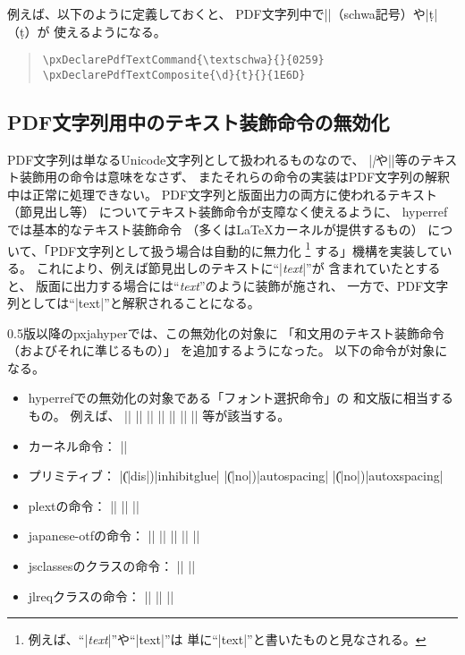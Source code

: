 \documentclass[uplatex,dvipdfmx,a4paper]{jsarticle}
\newcommand{\Pkg}[1]{\textsf{#1}}
\newcommand{\Means}{：\quad}
\newcommand{\／}{\mbox{}／\mbox{}}
\begin{document}
例えば、以下のように定義しておくと、
PDF文字列中で|\textschwa|（schwa記号）や|\d{t}|（\d{t}）が
使えるようになる。
\begin{quote}\small\begin{verbatim}
\pxDeclarePdfTextCommand{\textschwa}{}{0259}
\pxDeclarePdfTextComposite{\d}{t}{}{1E6D}
\end{verbatim}\end{quote}

\subsection{PDF文字列用中のテキスト装飾命令の無効化}
\label{ssec:disablecmds}

PDF文字列は単なるUnicode文字列として扱われるものなので、
|\textit|や|\large|等のテキスト装飾用の命令は意味をなさず、
またそれらの命令の実装はPDF文字列の解釈中は正常に処理できない。
PDF文字列と版面出力の両方に使われるテキスト（節見出し等）
についてテキスト装飾命令が支障なく使えるように、
\Pkg{hyperref}では基本的なテキスト装飾命令
（多くは{\LaTeX}カーネルが提供するもの）
について、「PDF文字列として扱う場合は自動的に無力化
\footnote{例えば、“|\textit{text}|”や“|{\large text}|”は
  単に“|text|”と書いたものと見なされる。}
する」機構を実装している。
これにより、例えば節見出しのテキストに“|\textit{text}|”が
含まれていたとすると、
版面に出力する場合には“\textit{text}”のように装飾が施され、
一方で、PDF文字列としては“|text|”と解釈されることになる。

0.5版以降の\Pkg{pxjahyper}では、この無効化の対象に
「和文用のテキスト装飾命令（およびそれに準じるもの）」
を追加するようになった。
以下の命令が対象になる。

\begin{itemize}
\item \Pkg{hyperref}での無効化の対象である「フォント選択命令」の
  和文版に相当するもの。
  例えば、
  |\textmc| |\gtfamily| |\kanjifamily| |\romanshape|
  |\usekanji| |\useroman| |\userelfont|
  等が該当する。
\item {\pLaTeX}カーネル命令\Means
  |\<|
\item {\pTeX}プリミティブ\Means
  |\|(|dis|)|inhibitglue| |\|(|no|)|autospacing| |\|(|no|)|autoxspacing|
\item \Pkg{plext}の命令\Means
  |\bou| |\kasen| |\rensuji|
\item \Pkg{japanese-otf}の命令\Means
  |\textmg| |\mgfamily| |\ltseries| |\ebseries| |\propshape|
\item \Pkg{jsclasses}のクラスの命令\Means
  |\maybeblue| |\HUGE|
\item \Pkg{jlreq}クラスの命令\Means
  |\jafontsize| |\tatechuyoko| |\jidori| %
\end{itemize}
\end{document}
